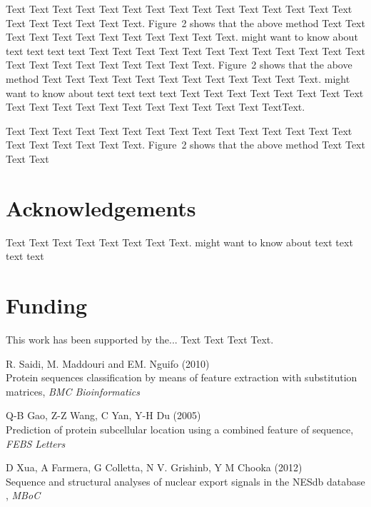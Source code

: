 \documentclass{bioinfo}
\begin{document}
Text Text Text Text Text Text Text Text Text Text Text Text Text
Text Text Text Text Text Text Text Text.
Figure~2\vphantom{\ref{fig:02}} shows\vadjust{\pagebreak} that the
above method  Text Text Text Text Text Text Text Text Text Text
Text Text.  \citealp{Boffelli03} might want to know about text
text text text Text Text Text Text Text Text  Text Text Text Text
Text Text Text Text Text Text Text Text Text Text Text.
Figure~2\vphantom{\ref{fig:02}} shows that the above method  Text
Text Text Text Text Text Text Text Text Text  Text Text.
\citealp{Boffelli03} might want to know about text text text text
Text Text Text Text Text Text  Text Text Text Text Text Text Text
Text Text Text Text Text Text Text\break Text.


Text Text Text Text Text Text  Text Text Text Text Text Text Text
Text Text  Text Text Text Text Text Text.
Figure~2\vphantom{\ref{fig:02}} shows that the above method  Text
Text Text Text\vspace*{-10pt}


\section*{Acknowledgements}

Text Text Text Text Text Text  Text Text.  \citealp{Boffelli03} might want to know about  text
text text text\vspace*{-12pt}

\section*{Funding}

This work has been supported by the... Text Text  Text Text.\vspace*{-12pt}

%
%
%
%
%
%
%
%
%




\begin{thebibliography}{}

R. Saidi, M. Maddouri and EM. Nguifo (2010) \\
Protein sequences classification by means of feature extraction with substitution matrices, {\it BMC Bioinformatics}

Q-B Gao, Z-Z Wang, C Yan, Y-H Du (2005)\\ 
Prediction of protein subcellular location using a combined feature of sequence, {\it FEBS Letters}

D Xua, A Farmera, G Colletta, N V. Grishinb, Y M Chooka (2012)\\
Sequence and structural analyses of nuclear export signals in the NESdb database , {\it MBoC}

\end{thebibliography}
\end{document}

